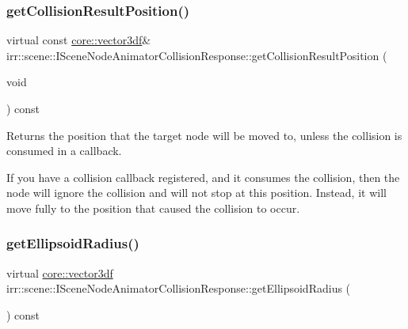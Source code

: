 \subsubsection{\texorpdfstring{get\+Collision\+Result\+Position()}{getCollisionResultPosition()}\hspace{0.1cm}{\footnotesize\ttfamily [2/2]}}
{\footnotesize\ttfamily virtual const \hyperlink{namespaceirr_1_1core_ae6e2b2a6c552833ebbd5b7463d03586b}{core\+::vector3df}\& irr\+::scene\+::\+I\+Scene\+Node\+Animator\+Collision\+Response\+::get\+Collision\+Result\+Position (\begin{DoxyParamCaption}\item[{void}]{ }\end{DoxyParamCaption}) const\hspace{0.3cm}{\ttfamily [pure virtual]}}



Returns the position that the target node will be moved to, unless the collision is consumed in a callback. 

If you have a collision callback registered, and it consumes the collision, then the node will ignore the collision and will not stop at this position. Instead, it will move fully to the position that caused the collision to occur. \mbox{\label{classirr_1_1scene_1_1ISceneNodeAnimatorCollisionResponse_a92965919db3dfbaab2d1f4987a2c52c1}} 
\subsubsection{\texorpdfstring{get\+Ellipsoid\+Radius()}{getEllipsoidRadius()}\hspace{0.1cm}{\footnotesize\ttfamily [1/2]}}
{\footnotesize\ttfamily virtual \hyperlink{namespaceirr_1_1core_ae6e2b2a6c552833ebbd5b7463d03586b}{core\+::vector3df} irr\+::scene\+::\+I\+Scene\+Node\+Animator\+Collision\+Response\+::get\+Ellipsoid\+Radius (\begin{DoxyParamCaption}{ }\end{DoxyParamCaption}) const\hspace{0.3cm}{\ttfamily [pure virtual]}}



